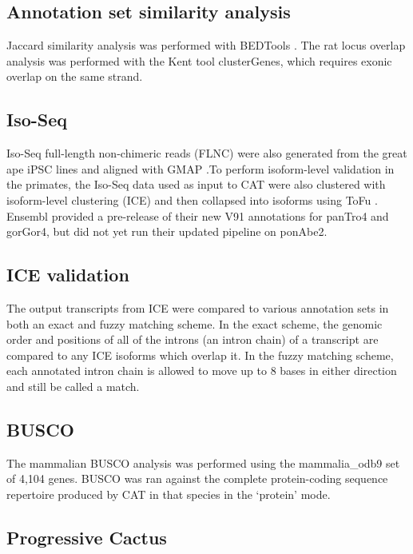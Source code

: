\documentclass[fleqn,10pt]{wlscirep}
\begin{document}
\subsection*{Annotation set similarity analysis}

Jaccard similarity analysis was performed with BEDTools \cite{quinlan2010bedtools}. The rat locus overlap analysis was performed with the Kent tool clusterGenes, which requires exonic overlap on the same strand.

\subsection*{Iso-Seq}

Iso-Seq full-length non-chimeric reads (FLNC) were also generated from the great ape iPSC lines and aligned with GMAP \cite{wu2005gmap}.To perform isoform-level validation in the primates, the Iso-Seq data used as input to CAT were also clustered with isoform-level clustering (ICE) and then collapsed into isoforms using ToFu \cite{gordon2015widespread}. Ensembl provided a pre-release of their new V91 annotations for panTro4 and gorGor4, but did not yet run their updated pipeline on ponAbe2.

\subsection*{ICE validation}

The output transcripts from ICE were compared to various annotation sets in both an exact and fuzzy matching scheme. In the exact scheme, the genomic order and positions of all of the introns (an intron chain) of a transcript are compared to any ICE isoforms which overlap it. In the fuzzy matching scheme, each annotated intron chain is allowed to move up to 8 bases in either direction and still be called a match.

\subsection*{BUSCO}

The mammalian BUSCO analysis was performed using the mammalia\_odb9 set of 4,104 genes. BUSCO was ran against the complete protein-coding sequence repertoire produced by CAT in that species in the `protein' mode.

\subsection*{Progressive Cactus}
\end{document}
